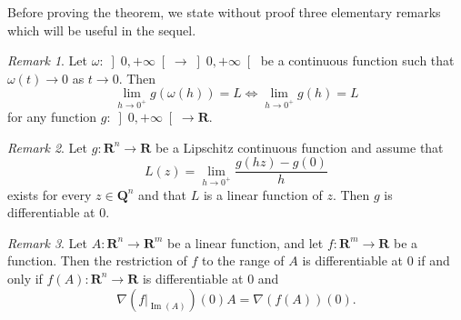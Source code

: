 \documentclass[draft]{amsart}
\theoremstyle{definition}
\theoremstyle{remark}
\newtheorem{rem}{Remark}[section]
\begin{document}
Before proving the theorem, we state without proof three elementary
remarks which will be useful in the sequel.
\begin{rem}\label{r:omb}
Let $\omega\colon \left]0,+\infty\right[\to \left]0,+\infty\right[$
be a continuous function such that $\omega (t)\to 0$ as $t\to
0$. Then
\[\lim_{h\to 0^+}g(\omega(h))=L\Leftrightarrow\lim_{h\to
0^+}g(h)=L\]
for any function $g\colon \left]0,+\infty\right[\to \mathbf{R}$.
\end{rem}
\begin{rem}\label{r:dif}
Let $g \colon  \mathbf{R}^n\to \mathbf{R}$ be a Lipschitz
continuous function and assume that
\[L(z)=\lim_{h\to 0^+}\frac{g(hz)-g(0)}h\]
exists for every $z\in\mathbf{Q}^n$ and that $L$ is a linear function of $z$.
Then $g$ is differentiable at 0.
\end{rem}
\begin{rem}\label{r:dif0}
Let $A \colon  \mathbf{R}^n\to \mathbf{R}^m$ be a linear
function, and let $f \colon  \mathbf{R}^m\to \mathbf{R}$ be a function. Then
the restriction of $f$ to the range of $A$ is differentiable at 0 if and
only if $f(A)\colon \mathbf{R}^n\to \mathbf{R}$ is differentiable at 0 and
\[\nabla(f|_{\operatorname{Im}(A)})(0)A=\nabla (f(A))(0).\]
\end{rem}
\end{document}

